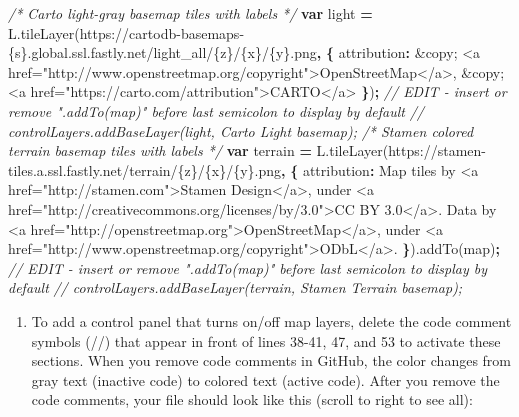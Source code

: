 \documentclass[
  english,
]{book}
\newenvironment{Shaded}{\begin{snugshade}}{\end{snugshade}}
\newcommand{\AttributeTok}[1]{\textcolor[rgb]{0.77,0.63,0.00}{#1}}
\newcommand{\CommentTok}[1]{\textcolor[rgb]{0.56,0.35,0.01}{\textit{#1}}}
\newcommand{\DataTypeTok}[1]{\textcolor[rgb]{0.13,0.29,0.53}{#1}}
\newcommand{\KeywordTok}[1]{\textcolor[rgb]{0.13,0.29,0.53}{\textbf{#1}}}
\newcommand{\NormalTok}[1]{#1}
\newcommand{\OperatorTok}[1]{\textcolor[rgb]{0.81,0.36,0.00}{\textbf{#1}}}
\newcommand{\StringTok}[1]{\textcolor[rgb]{0.31,0.60,0.02}{#1}}
\newcommand{\VariableTok}[1]{\textcolor[rgb]{0.00,0.00,0.00}{#1}}
\providecommand{\tightlist}{%
  \setlength{\itemsep}{0pt}\setlength{\parskip}{0pt}}
\begin{document}
\begin{Shaded}
\begin{Highlighting}[]
\CommentTok{/* Carto light{-}gray basemap tiles with labels */}
\KeywordTok{var}\NormalTok{ light }\OperatorTok{=} \VariableTok{L}\NormalTok{.}\AttributeTok{tileLayer}\NormalTok{(}\StringTok{\textquotesingle{}https://cartodb{-}basemaps{-}\{s\}.global.ssl.fastly.net/light\_all/\{z\}/\{x\}/\{y\}.png\textquotesingle{}}\OperatorTok{,} \OperatorTok{\{}
  \DataTypeTok{attribution}\OperatorTok{:} \StringTok{\textquotesingle{}\&copy; <a href="http://www.openstreetmap.org/copyright">OpenStreetMap</a>, \&copy; <a href="https://carto.com/attribution">CARTO</a>\textquotesingle{}}
\OperatorTok{\}}\NormalTok{)}\OperatorTok{;} \CommentTok{// EDIT {-} insert or remove ".addTo(map)" before last semicolon to display by default}
\CommentTok{// controlLayers.addBaseLayer(light, \textquotesingle{}Carto Light basemap\textquotesingle{});}
\CommentTok{/* Stamen colored terrain basemap tiles with labels */}
\KeywordTok{var}\NormalTok{ terrain }\OperatorTok{=} \VariableTok{L}\NormalTok{.}\AttributeTok{tileLayer}\NormalTok{(}\StringTok{\textquotesingle{}https://stamen{-}tiles.a.ssl.fastly.net/terrain/\{z\}/\{x\}/\{y\}.png\textquotesingle{}}\OperatorTok{,} \OperatorTok{\{}
  \DataTypeTok{attribution}\OperatorTok{:} \StringTok{\textquotesingle{}Map tiles by <a href="http://stamen.com">Stamen Design</a>, under <a href="http://creativecommons.org/licenses/by/3.0">CC BY 3.0</a>. Data by <a href="http://openstreetmap.org">OpenStreetMap</a>, under <a href="http://www.openstreetmap.org/copyright">ODbL</a>.\textquotesingle{}}
\OperatorTok{\}}\NormalTok{).}\AttributeTok{addTo}\NormalTok{(map)}\OperatorTok{;} \CommentTok{// EDIT {-} insert or remove ".addTo(map)" before last semicolon to display by default}
\CommentTok{// controlLayers.addBaseLayer(terrain, \textquotesingle{}Stamen Terrain basemap\textquotesingle{});}
\end{Highlighting}
\end{Shaded}

\begin{enumerate}
\def\labelenumi{\arabic{enumi})}
\setcounter{enumi}{15}
\tightlist
\item
  To add a control panel that turns on/off map layers, delete the code comment symbols (//) that appear in front of lines 38-41, 47, and 53 to activate these sections. When you remove code comments in GitHub, the color changes from gray text (inactive code) to colored text (active code). After you remove the code comments, your file should look like this (scroll to right to see all):
\end{enumerate}
\end{document}

